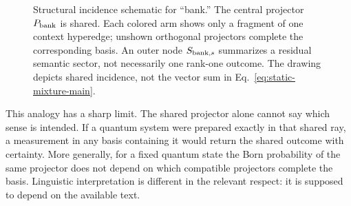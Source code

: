 \documentclass[
  aps,
  reprint,
  superscriptaddress,
  floatfix,
  nofootinbib,
  longbibliography
]{revtex4-2}
\begin{document}
\begin{figure}[t]
\centering
{}
\caption{Structural incidence schematic for ``bank.''  The central projector
$P_{\rm bank}$ is shared.  Each colored arm shows only a fragment of one
context hyperedge; unshown orthogonal projectors complete the corresponding
basis.  An outer node $S_{{\rm bank},s}$ summarizes a residual semantic sector,
not necessarily one rank-one outcome.  The drawing depicts shared incidence,
not the vector sum in Eq.~\eqref{eq:static-mixture-main}.}
\label{fig:contexts}
\end{figure}

This analogy has a sharp limit.  The shared projector alone cannot say which
sense is intended.  If a quantum system were prepared exactly in that shared
ray, a measurement in any basis containing it would return the shared outcome
with certainty.  More generally, for a fixed quantum state the Born
probability of the same projector does not depend on which compatible
projectors complete the basis.  Linguistic interpretation is different in the
relevant respect: it is supposed to depend on the available text.
\end{document}
